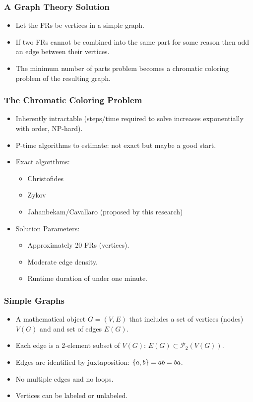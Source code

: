 \documentclass{beamer}
\renewcommand{\P}{\mathcal{P}}
\DeclarePairedDelimiter{\set}{\{}{\}}
\begin{document}
\begin{frame}
  \frametitle{A Graph Theory Solution}
  \begin{itemize}
  \item Let the FRs be vertices in a simple graph.
  \item If two FRs cannot be combined into the same part for some reason then add an edge between their vertices.
  \item The minimum number of parts problem becomes a chromatic coloring problem of the resulting graph.
  \end{itemize}
\end{frame}

\begin{frame}
  \frametitle{The Chromatic Coloring Problem}
  \begin{itemize}
  \item Inherently intractable (steps/time required to solve increases exponentially with order, NP-hard).
  \item P-time algorithms to estimate: not exact but maybe a good start.
  \item Exact algorithms:
    \begin{itemize}
    \item Christofides
    \item Zykov
    \item Jahanbekam/Cavallaro (proposed by this research)
    \end{itemize}
  \item Solution Parameters:
    \begin{itemize}
    \item Approximately 20 FRs (vertices).
    \item Moderate edge density.
    \item Runtime duration of under one minute.
    \end{itemize}
  \end{itemize}
\end{frame}

\begin{frame}
  \frametitle{Simple Graphs}
  \begin{itemize}
  \item A mathematical object \(G=(V,E)\) that includes a set of vertices (nodes) \(V(G)\) and and set of edges
    \(E(G)\).
  \item Each edge is a 2-element subset of \(V(G)\): \(E(G)\subset\P_2(V(G))\).
  \item Edges are identified by juxtaposition: \(\set{a,b}=ab=ba\).
  \item No multiple edges and no loops.
  \item Vertices can be labeled or unlabeled.
  \end{itemize}
\end{frame}
\end{document}
